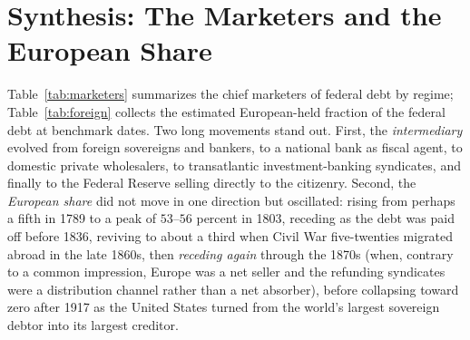 \documentclass[12pt]{article}
\begin{document}
\section{Synthesis: The Marketers and the European Share}

Table~\ref{tab:marketers} summarizes the chief marketers of federal debt by
regime; Table~\ref{tab:foreign} collects the estimated European-held fraction of
the federal debt at benchmark dates. Two long movements stand out. First, the
\emph{intermediary} evolved from foreign sovereigns and bankers, to a national
bank as fiscal agent, to domestic private wholesalers, to transatlantic
investment-banking syndicates, and finally to the Federal Reserve selling
directly to the citizenry. Second, the \emph{European share} did not move in one
direction but oscillated: rising from perhaps a fifth in 1789 to a peak of
$53$--$56$ percent in 1803, receding as the debt was paid off before 1836,
reviving to about a third when Civil War five-twenties migrated abroad in the late
1860s, then \emph{receding again} through the 1870s (when, contrary to a common
impression, Europe was a net seller and the refunding syndicates were a
distribution channel rather than a net absorber), before collapsing toward zero
after 1917 as the United States turned from the world's largest sovereign debtor
into its largest creditor.
\end{document}

